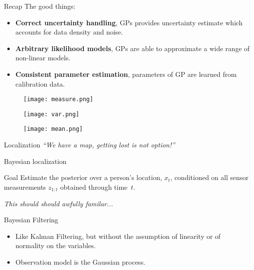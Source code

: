 \documentclass{beamer}
\begin{document}
\begin{frame}{Recap}
  The good things:
  \begin{itemize}
  \item \textbf{Correct uncertainty handling}, GPs provides uncertainty
    estimate which accounts for data density and noise.
  \item \textbf{Arbitrary likelihood models}, GPs are able to approximate
    a wide range of non-linear models.
  \item \textbf{Consistent parameter estimation}, parameters of GP are learned
    from calibration data.
  \end{itemize}
\end{frame}

\begin{frame}
  \begin{figure}
    \centering
    \texttt{[image: measure.png]}
  \end{figure}
\end{frame}

\begin{frame}
  \begin{figure}
    \centering
    \texttt{[image: var.png]}
  \end{figure}
\end{frame}

\begin{frame}
  \begin{figure}
    \centering
    \texttt{[image: mean.png]}
  \end{figure}
\end{frame}


\begin{frame}{Localization}
  \centering
  \textit{``We have a map, getting lost is not option!''}
\end{frame}

\begin{frame}{Bayesian localization}
\begin{block}{Goal}
Estimate the posterior over a person's location, $x_t$,
conditioned on all sensor measurements $z_{1:t}$ obtained through
\mbox{time $t$}.
\end{block}
\pause
\emph{This should should awfully familar...}
\end{frame}

\begin{frame}{Bayesian Filtering}
  \begin{itemize}
  \item Like Kalman Filtering, but without the assumption of linearity
    or of normality on the variables.
  \item Observation model is the Gaussian process.
  \end{itemize}
\end{frame}
\end{document}
